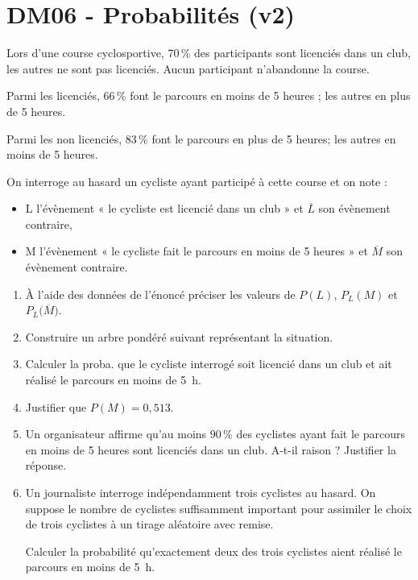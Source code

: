 \documentclass[a4paper,11pt]{article}
\author{Pierquet}
\title{\nomfichier}
\begin{document}
\pagestyle{fancy}

\thispagestyle{entetedm}

\setcounter{numexos}{0}

\part{DM06 - Probabilités (v2)}

\smallskip

\exonum{}

\medskip

Lors d’une course cyclosportive, 70\,\% des participants sont licenciés dans un club, les autres ne sont pas licenciés. Aucun participant n’abandonne la course.

Parmi les licenciés, 66\,\% font le parcours en moins de 5 heures ; les autres en plus de 5 heures.

Parmi les non licenciés, 83\,\% font le parcours en plus de 5 heures; les autres en moins de 5 heures.

On interroge au hasard un cycliste ayant participé à cette course et on note :
%
\begin{itemize}
	\item L l’évènement « le cycliste est licencié dans un club » et $\overline{L}$ son évènement contraire,
	\item M l’évènement « le cycliste fait le parcours en moins de 5 heures » et $\overline{M}$ son évènement contraire.
\end{itemize}
%
\begin{enumerate}
	\item À l’aide des données de l’énoncé préciser les valeurs de $P(L)$, $P_L(M)$ et $P_L \big( \overline{M} \big)$.
	\item Construire un arbre pondéré suivant représentant la situation.
	\item Calculer la proba. que le cycliste interrogé soit licencié dans un club et ait réalisé le parcours en moins de 5~h.
	\item Justifier que $P(M) = 0,513$.
	\item Un organisateur affirme qu’au moins 90\,\% des cyclistes ayant fait le parcours en moins de 5 heures sont licenciés dans un club. A-t-il raison ? Justifier la réponse.
	\item Un journaliste interroge indépendamment trois cyclistes au hasard. On suppose le nombre de cyclistes suffisamment important pour assimiler le choix de trois cyclistes à un tirage aléatoire avec remise.
	
	Calculer la probabilité qu’exactement deux des trois cyclistes aient réalisé le parcours en moins de 5~h.
\end{enumerate}
\end{document}
